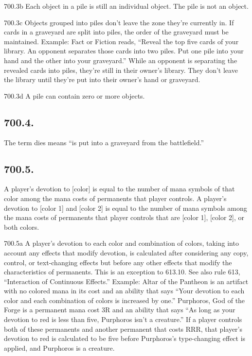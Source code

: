 700.3b Each object in a pile is still an individual object. The pile is not an object.

700.3c Objects grouped into piles don’t leave the zone they’re currently in. If cards in a graveyard are split into piles, the order of the graveyard must be maintained.
Example: Fact or Fiction reads, “Reveal the top five cards of your library. An opponent separates those cards into two piles. Put one pile into your hand and the other into your graveyard.” While an opponent is separating the revealed cards into piles, they’re still in their owner’s library. They don’t leave the library until they’re put into their owner’s hand or graveyard.

700.3d A pile can contain zero or more objects.

\subsection*{700.4.}
The term dies means “is put into a graveyard from the battlefield.”

\subsection*{700.5.}
A player’s devotion to [color] is equal to the number of mana symbols of that color among the mana costs of permanents that player controls. A player’s devotion to [color 1] and [color 2] is equal to the number of mana symbols among the mana costs of permanents that player controls that are [color 1], [color 2], or both colors.

700.5a A player’s devotion to each color and combination of colors, taking into account any effects that modify devotion, is calculated after considering any copy, control, or text-changing effects but before any other effects that modify the characteristics of permanents. This is an exception to 613.10. See also rule 613, “Interaction of Continuous Effects.”
Example: Altar of the Pantheon is an artifact with no colored mana in its cost and an ability that says “Your devotion to each color and each combination of colors is increased by one.” Purphoros, God of the Forge is a permanent mana cost {3}{R} and an ability that says “As long as your devotion to red is less than five, Purphoros isn’t a creature.” If a player controls both of these permanents and another permanent that costs {R}{R}{R}, that player’s devotion to red is calculated to be five before Purphoros’s type-changing effect is applied, and Purphoros is a creature.

